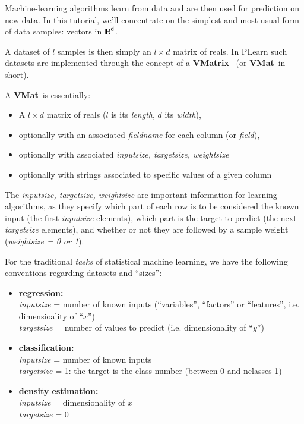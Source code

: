\documentclass[11pt]{book}
\newcommand{\R}{\sf{I\!R}}
\newcommand{\VMatrix}{{\bf VMatrix}~}
\newcommand{\VMat}{{\bf VMat}~}
\begin{document}
Machine-learning algorithms learn from data and are then used for prediction on new data.
In this tutorial, we'll concentrate on the simplest and most usual form of
data samples: vectors in $\R^d$. 

A dataset of $l$ samples is then simply an $l \times d$ matrix of reals.
In PLearn such datasets are implemented through the concept of a \VMatrix
(or \VMat in short).

A \VMat is essentially:
\begin{itemize}
\item A $l \times d$ matrix of reals ($l$ is its {\em length}, $d$ its {\em width}),
\item optionally with an associated {\em fieldname} for each column (or {\em field}),
\item optionally with associated {\em inputsize, targetsize, weightsize}
\item optionally with strings associated to specific values of a given column
\end{itemize}

The {\em inputsize, targetsize, weightsize} are important information for
learning algorithms, as they specify which part of each row is to be
considered the known input (the first {\em inputsize} elements), which part
is the target to predict (the next {\em targetsize} elements), and whether
or not they are followed by a sample weight ({\em weightsize = 0 or
  1}).

For the traditional {\em tasks} of statistical machine learning, we have
the following conventions regarding datasets and ``sizes'':
\begin{itemize}
\item {\bf regression:} \\
{\em inputsize} = number of known inputs (``variables'', ``factors'' or ``features'', i.e. dimensioality of ``$x$'')\\
{\em targetsize} = number of values to predict (i.e. dimensionality of ``$y$'')
\item {\bf classification:} \\
{\em inputsize} = number of known inputs \\
{\em targetsize} = 1: the target is the class number (between 0 and nclasses-1)
\item {\bf density estimation:} \\
{\em inputsize} = dimensionality of $x$ \\
{\em targetsize} = 0
\end{itemize}
\end{document}
